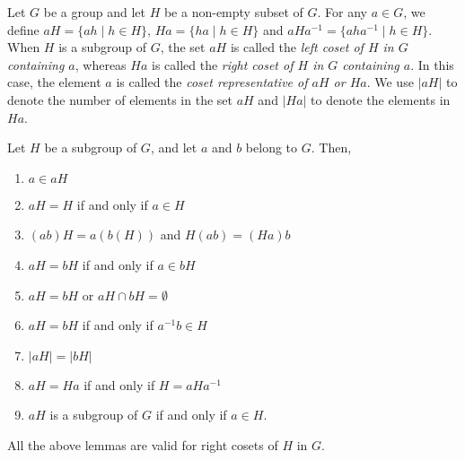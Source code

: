 \begin{definition}[Coset of $H$ in $G$]
	Let $G$ be a group and let $H$ be a non-empty subset of $G$. For any $a\in G$, we define $aH=\{ah\mid h\in H\}$, $Ha=\{ha\mid h\in H\}$ and $aHa^{-1}=\{aha^{-1}\mid h\in H\}$. When $H$ is a subgroup of $G$, the set $aH$ is called the \textit{left coset of $H$ in $G$ containing $a$}, whereas $Ha$ is called the \textit{right coset of $H$ in $G$ containing $a$}. In this case, the element $a$ is called the \textit{coset representative of $aH$ or $Ha$}. We use $|aH|$ to denote the number of elements in the set $aH$ and $|Ha|$ to denote the elements in $Ha$.
\end{definition}

\begin{lemma}
	Let $H$ be a subgroup of $G$, and let $a$ and $b$ belong to $G$. Then,
	\begin{enumerate}
		\item $a\in aH$
		\item $aH=H$ if and only if $a\in H$
		\item $(ab)H=a(b(H))$ and $H(ab)=(Ha)b$
		\item $aH=bH$ if and only if $a\in bH$
		\item $aH=bH$ or $aH\cap bH=\emptyset$
		\item $aH=bH$ if and only if $a^{-1}b\in H$
		\item $|aH|=|bH|$
		\item $aH=Ha$ if and only if $H=aHa^{-1}$
		\item $aH$ is a subgroup of $G$ if and only if $a\in H$.
	\end{enumerate}
	All the above lemmas are valid for right cosets of $H$ in $G$.
\end{lemma}

